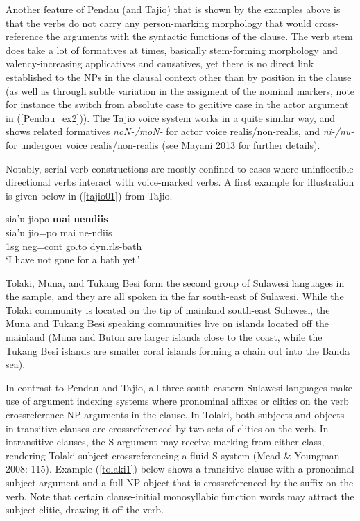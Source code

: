 Another feature of Pendau (and Tajio) that is shown by the examples above is that the verbs do not carry any person-marking morphology that would cross-reference the arguments with the syntactic functions of the clause. The verb stem does take a lot of formatives at times, basically stem-forming morphology and valency-increasing applicatives and causatives, yet there is no direct link established to the NPs in the clausal context other than by position in the clause (as well as through subtle variation in the assigment of the nominal markers, note for instance the switch from absolute case to genitive case in the actor argument in (\ref{Pendau_ex2})). The Tajio voice system works in a quite similar way, and shows related formatives \textit{noN-/moN-} for actor voice realis/non-realis, and \textit{ni-/nu-} for undergoer voice realis/non-realis (see Mayani 2013 for further details). 

Notably, serial verb constructions are mostly confined to cases where uninflectible directional verbs interact with voice-marked verbs. A first example for illustration is given below in (\ref{tajio01}) from Tajio.

\ea \label{tajio01}
\glll sia’u jiopo \textbf{mai} \textbf{nendiis} \\
sia’u jio=po mai ne-ndiis \\
 \acs{1}\acs{sg} \acs{neg}=\acs{cont} go.to \acs{dyn}.\acs{rls}-bath\\
\glft ‘I have not gone for a bath yet.’ \\ 
\endgl
\xe

Tolaki, Muna, and Tukang Besi form the second group of Sulawesi languages in the sample, and they are all spoken in the far south-east of Sulawesi. While the Tolaki community is located on the tip of mainland south-east Sulawesi, the Muna and Tukang Besi speaking communities live on islands located off the mainland (Muna and Buton are larger islands close to the coast, while the Tukang Besi islands are smaller coral islands forming a chain out into the Banda sea). 

In contrast to Pendau and Tajio, all three south-eastern Sulawesi languages make use of argument indexing systems where pronominal affixes or clitics on the verb crossreference NP arguments in the clause. In Tolaki, both subjects and objects in transitive clauses are crossreferenced by two sets of clitics on the verb. In intransitive clauses, the S argument may receive marking from either class, rendering Tolaki subject crossreferencing a fluid-S system (Mead \& Youngman 2008: 115). Example (\ref{tolaki1}) below shows a transitive clause with a prononimal subject argument and a full NP object that is crossreferenced by the suffix on the verb. Note that certain clause-initial monosyllabic function words may attract the subject clitic, drawing it off the verb.

